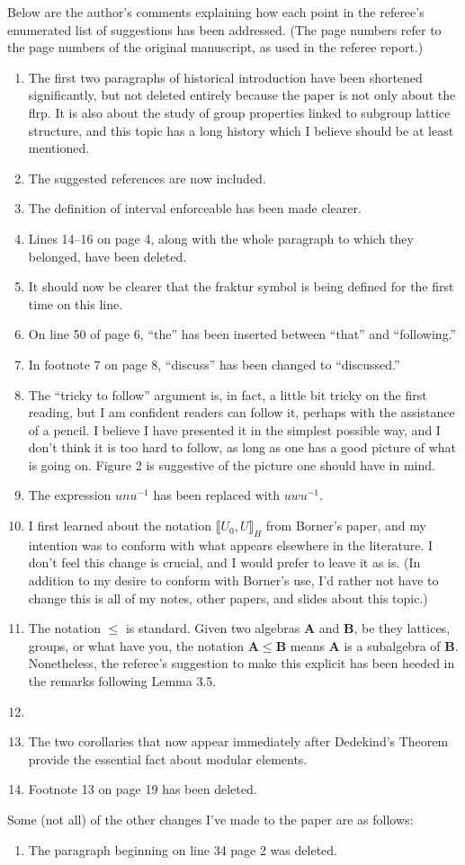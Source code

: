 \documentclass{article}
\newcommand{\bB}{{\mathbf{B}}}
\newcommand{\bA}{\ensuremath{\mathbf{A}}}
\newcommand{\lb}{\ensuremath{\llbracket}}
\newcommand{\rb}{\ensuremath{\rrbracket}}
\begin{document}
\vskip1cm
Below are the author's comments explaining how each point in the referee's
enumerated list of suggestions has been addressed.  (The page numbers refer
to the page numbers of the original manuscript, as used in the referee report.)
\begin{enumerate}[(1)]
\item The first two paragraphs of historical introduction have been
  shortened significantly, but not deleted entirely because the paper is not
  only about the \acs{flrp}.  It is also about the study of group properties
  linked to subgroup lattice structure, and this topic has a long history which
  I believe should be at least mentioned.
\item The suggested references are now included.
\item The definition of interval enforceable has been made clearer.
\item Lines 14--16 on page 4, along with the whole paragraph to which they
  belonged, have been deleted.
\item It should now be clearer that the fraktur symbol is being defined for the first
  time on this line.
\item On line 50 of page 6, ``the'' has been inserted between ``that'' and
  ``following.''
\item In footnote 7 on page 8, ``discuss'' has been changed to ``discussed.''
\item The ``tricky to follow'' argument is, in fact, a little bit tricky on the 
  first reading, but I am confident readers can follow it, perhaps with the
  assistance of a pencil.  I believe I have presented it in the simplest
  possible way, and I don't think it is too hard to follow, as long as
  one has a good picture of what is going on. Figure 2 is suggestive of the
  picture one should have in mind.
\item The expression $unu^{-1}$ has been replaced with $uwu^{-1}$.
\item I first learned about the notation $\lb U_0, U \rb_H$ from Borner's paper,
  and my intention was to conform with what appears elsewhere in the literature. I
  don't feel this change is crucial, and I would prefer to leave it as is.
  (In addition to my desire to conform with Borner's use, I'd rather not 
  have to change this is all of my notes, other papers, and slides about this
  topic.) 
\item The notation $\leq$ is standard. Given two algebras
  $\bA$ and $\bB$, be they lattices, groups, or what have you, the notation $\bA
  \leq \bB$ means $\bA$ is a subalgebra of $\bB$. Nonetheless, the referee's
  suggestion to make this explicit has been heeded in the remarks following
  Lemma 3.5. 
\item  
\item The two corollaries that now appear immediately after Dedekind's Theorem
  provide the essential fact about modular elements.
\item Footnote 13 on page 19 has been deleted.

\end{enumerate}

\vskip1cm
Some (not all) of the other changes I've made to the paper are as follows:
\begin{enumerate}[(1)]
\item 
The paragraph beginning on line 34 page 2 was deleted.
\end{enumerate}
\end{document}
